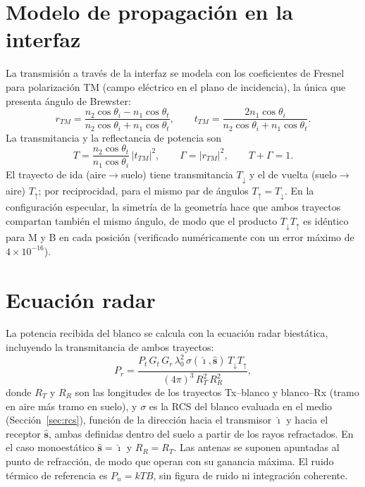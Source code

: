 \documentclass[11pt,a4paper]{report}
\newcommand{\uv}[1]{\hat{\bm{#1}}}
\begin{document}
\section{Modelo de propagación en la interfaz}
\label{sec:fresnel}

La transmisión a través de la interfaz se modela con los coeficientes de
Fresnel para polarización TM (campo eléctrico en el plano de incidencia),
la única que presenta ángulo de Brewster:
\begin{equation}
  r_{TM} = \frac{n_2\cos\theta_i - n_1\cos\theta_t}{n_2\cos\theta_i + n_1\cos\theta_t},
  \qquad
  t_{TM} = \frac{2n_1\cos\theta_i}{n_2\cos\theta_i + n_1\cos\theta_t}.
\end{equation}
La transmitancia y la reflectancia de potencia son
\begin{equation}
  T = \frac{n_2\cos\theta_t}{n_1\cos\theta_i}\,|t_{TM}|^2,
  \qquad
  \Gamma = |r_{TM}|^2,
  \qquad
  T+\Gamma = 1 .
\end{equation}
El trayecto de ida (aire$\to$suelo) tiene transmitancia $T_\downarrow$ y el
de vuelta (suelo$\to$aire) $T_\uparrow$; por reciprocidad, para el mismo par
de ángulos $T_\uparrow=T_\downarrow$. En la configuración especular, la
simetría de la geometría hace que ambos trayectos compartan también el mismo
ángulo, de modo que el producto $T_\downarrow T_\uparrow$ es idéntico para
M y B en cada posición (verificado numéricamente con un error máximo de
$4\times10^{-16}$).

\section{Ecuación radar}
\label{sec:radar}

La potencia recibida del blanco se calcula con la ecuación radar biestática,
incluyendo la transmitancia de ambos trayectos:
\begin{equation}
  P_r = \frac{P_t\,G_t\,G_r\,\lambda_0^2\,\sigma(\uv{\imath},\uv{s})\,
              T_\downarrow T_\uparrow}
             {(4\pi)^3\,R_T^2\,R_R^2},
  \label{eq:radar}
\end{equation}
donde $R_T$ y $R_R$ son las longitudes de los trayectos Tx--blanco y
blanco--Rx (tramo en aire más tramo en suelo), y $\sigma$ es la RCS del
blanco evaluada en el medio (Sección~\ref{sec:rcs}), función de la
dirección hacia el transmisor $\uv{\imath}$ y hacia el receptor $\uv{s}$,
ambas definidas dentro del suelo a partir de los rayos refractados. En el
caso monoestático $\uv{s}=\uv{\imath}$ y $R_R=R_T$. Las antenas se suponen
apuntadas al punto de refracción, de modo que operan con su ganancia
máxima. El ruido térmico de referencia es $P_n=kTB$, sin figura de ruido ni
integración coherente.
\end{document}
